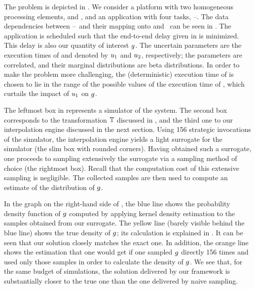 \newcommand{\cores}{\token{PE1} and \token{PE2}}
\newcommand{\tasks}{\token{T1}--\token{T4}}
The problem is depicted in . We consider a platform with two
homogeneous processing elements, \cores, and an application with four tasks,
\tasks. The data dependencies between \tasks\ and their mapping onto \cores\ can
be seen in . The application is scheduled such that the end-to-end
delay given in  is minimized. This delay is also our
quantity of interest $g$. The uncertain parameters are the execution times of
 and  denoted by $u_1$ and $u_2$, respectively; the
parameters are correlated, and their marginal distributions are beta
distributions. In order to make the problem more challenging, the
(deterministic) execution time of  is chosen to lie in the range of
the possible values of the execution time of , which curtails the
impact of $u_1$ on $g$.

The leftmost box in  represents a simulator of the system. The
second box corresponds to the transformation $\mathbb{T}$ discussed in
, and the third one to our interpolation engine discussed in
the next section. Using 156 strategic invocations of the simulator, the
interpolation engine yields a light surrogate for the simulator (the slim box
with rounded corners). Having obtained such a surrogate, one proceeds to
sampling extensively the surrogate via a sampling method of choice (the
rightmost box). Recall that the computation cost of this extensive sampling is
negligible. The collected samples are then used to compute an estimate of the
distribution of $g$.

In the graph on the right-hand side of , the blue line shows the
probability density function of $g$ computed by applying kernel density
estimation to the samples obtained from our surrogate. The yellow line (barely
visible behind the blue line) shows the true density of $g$; its calculation is
explained in . It can be seen that our solution closely
matches the exact one. In addition, the orange line shows the estimation that
one would get if one sampled $g$ directly 156 times and used only those samples
in order to calculate the density of $g$. We see that, for the same budget of
simulations, the solution delivered by our framework is substantially closer to
the true one than the one delivered by naive sampling.
